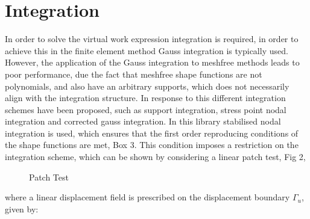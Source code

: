 \section{Integration}
In order to solve the virtual work expression integration is required, in order to achieve this in the finite element method Gauss integration is typically used. However, the application of the Gauss integration to meshfree methods leads to poor performance, due the fact that meshfree shape functions are not polynomials, and also have an arbitrary supports, which does not necessarily align with the integration structure. In response to this different integration schemes have been proposed, such as support integration, stress point nodal integration and corrected gauss integration. In this library stabilised nodal integration is used, which ensures that the first order reproducing conditions of the shape functions are met, Box 3. This condition imposes a restriction on the integration scheme, which can be shown by considering a linear patch test, Fig 2,
\begin{figure}
	\centering
	\caption{Patch Test }
\end{figure}
where a linear displacement field  is prescribed on the displacement boundary $\Gamma_u$, given by:


